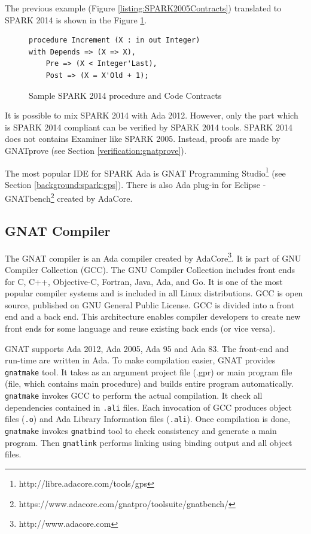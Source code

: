 The previous example (Figure \ref{listing:SPARK2005Contracts}) translated to SPARK 2014 is shown in the Figure \ref{listing:SPARK2014Contracts}.

\begin{figure}
\singlespacing
\begin{lstlisting}[language=ada2012, frame=single, gobble=0]
procedure Increment (X : in out Integer)
with Depends => (X => X),
	Pre => (X < Integer'Last),
	Post => (X = X'Old + 1);
\end{lstlisting}
\doublespacing
\caption{Sample SPARK 2014 procedure and Code Contracts}
\label{listing:SPARK2014Contracts}
\end{figure}

It is possible to mix SPARK 2014 with Ada 2012. However, only the part which is SPARK 2014 compliant can be verified by SPARK 2014 tools. SPARK 2014 does not contains Examiner like SPARK 2005. Instead, proofs are made by GNATprove (see Section \ref{verification:gnatprove}).

The most popular IDE for SPARK Ada is GNAT Programming Studio\footnote{http://libre.adacore.com/tools/gps} (see Section \ref{background:spark:gps}). There is also Ada plug-in for Eclipse - GNATbench\footnote{https://www.adacore.com/gnatpro/toolsuite/gnatbench/} created by AdaCore. 



\subsection{GNAT Compiler}
\label{background:spark:gnat}

The GNAT compiler is an Ada compiler created by AdaCore\footnote{http://www.adacore.com}. It is part of GNU Compiler Collection (GCC). The GNU Compiler Collection includes front ends for C, C++, Objective-C, Fortran, Java, Ada, and Go. It is one of the most popular compiler systems and is included in all Linux distributions. GCC is open source, published on GNU General Public License. GCC is divided into a front end and a back end. This architecture enables compiler developers to create new front ends for some language and reuse existing back ends (or vice versa).

GNAT supports Ada 2012, Ada 2005, Ada 95 and Ada 83. The front-end and run-time are written in Ada. To make compilation easier, GNAT provides \lstinline{gnatmake} tool. It takes as an argument project file (.gpr) or main program file (file, which contains main procedure) and builds entire program automatically. \lstinline{gnatmake} invokes GCC to perform the actual compilation. It check all dependencies contained in \lstinline{.ali} files. Each invocation of GCC produces object files (\lstinline{.o}) and Ada Library Information files (\lstinline{.ali}). Once compilation is done, \lstinline{gnatmake} invokes \lstinline{gnatbind} tool to check consistency and generate a main program. Then \lstinline{gnatlink} performs linking using binding output and all object files.

